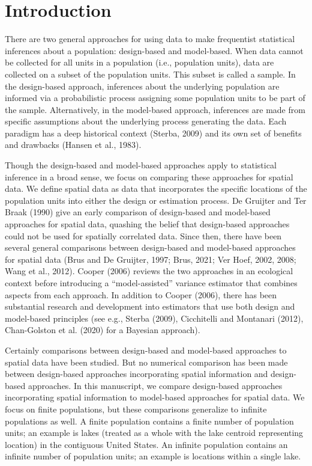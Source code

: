 \documentclass[]{elsarticle} %
\begin{document}
\hypertarget{sec:introduction}{%
\section{Introduction}\label{sec:introduction}}

There are two general approaches for using data to make frequentist
statistical inferences about a population: design-based and model-based.
When data cannot be collected for all units in a population (i.e.,
population units), data are collected on a subset of the population
units. This subset is called a sample. In the design-based approach,
inferences about the underlying population are informed via a
probabilistic process assigning some population units to be part of the
sample. Alternatively, in the model-based approach, inferences are made
from specific assumptions about the underlying process generating the
data. Each paradigm has a deep historical context (Sterba, 2009) and its
own set of benefits and drawbacks (Hansen et al., 1983).

Though the design-based and model-based approaches apply to statistical
inference in a broad sense, we focus on comparing these approaches for
spatial data. We define spatial data as data that incorporates the
specific locations of the population units into either the design or
estimation process. De Gruijter and Ter Braak (1990) give an early
comparison of design-based and model-based approaches for spatial data,
quashing the belief that design-based approaches could not be used for
spatially correlated data. Since then, there have been several general
comparisons between design-based and model-based approaches for spatial
data (Brus and De Gruijter, 1997; Brus, 2021; Ver Hoef, 2002, 2008; Wang
et al., 2012). Cooper (2006) reviews the two approaches in an ecological
context before introducing a ``model-assisted'' variance estimator that
combines aspects from each approach. In addition to Cooper (2006), there
has been substantial research and development into estimators that use
both design and model-based principles (see e.g., Sterba (2009),
Cicchitelli and Montanari (2012), Chan-Golston et al. (2020) for a
Bayesian approach).

Certainly comparisons between design-based and model-based approaches to
spatial data have been studied. But no numerical comparison has been
made between design-based approaches incorporating spatial information
and design-based approaches. In this manuscript, we compare design-based
approaches incorporating spatial information to model-based approaches
for spatial data. We focus on finite populations, but these comparisons
generalize to infinite populations as well. A finite population contains
a finite number of population units; an example is lakes (treated as a
whole with the lake centroid representing location) in the contiguous
United States. An infinite population contains an infinite number of
population units; an example is locations within a single lake.
\end{document}

